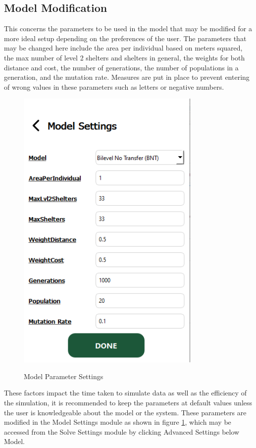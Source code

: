 \subsection{Model Modification}
	This concerns the parameters to be used in the model that may be modified for a more ideal setup depending on the preferences of the user. The parameters that may be changed here include the area per individual based on meters squared, the max number of level 2 shelters and shelters in general, the weights for both distance and cost, the number of generations, the number of populations in a generation, and the mutation rate. Measures are put in place to prevent entering of wrong values in these parameters such as letters or negative numbers. 
	
	\begin{figure}[h!]
		\caption{Model Parameter Settings}
		\centering
		\includegraphics[width=3.5in]{Chapter 4/modelsettings}
		\label{modelSet}
	\end{figure}
	These factors impact the time taken to simulate data as well as the efficiency of the simulation, it is recommended to keep the parameters at default values unless the user is knowledgeable about the model or the system. These parameters are modified in the Model Settings module as shown in figure \ref{modelSet}, which may be accessed from the Solve Settings module by clicking Advanced Settings below Model.
	
